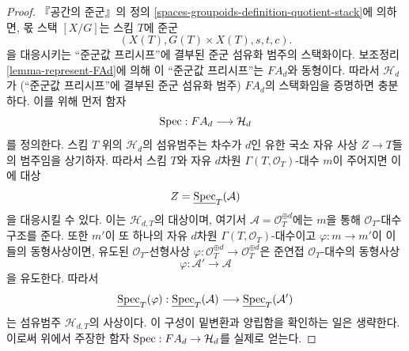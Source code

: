 \begin{proof}
『공간의 준군』의 정의
\ref{spaces-groupoids-definition-quotient-stack}에 의하면,
몫 스택 $[X/G]$는 스킴 $T$에 준군
$$
(X(T), G(T) \times X(T), s, t, c).
$$
을 대응시키는 ``준군값 프리시프''에 결부된 준군 섬유화 범주의
스택화이다. 보조정리 \ref{lemma-represent-FAd}에 의해 이
``준군값 프리시프''는 $FA_d$와 동형이다. 따라서
$\mathcal{H}_d$가 (``준군값 프리시프''에 결부된 준군 섬유화 범주)
$FA_d$의 스택화임을 증명하면 충분하다. 이를 위해 먼저 함자
$$
\mathop{\mathrm{Spec}} : FA_d \longrightarrow \mathcal{H}_d
$$
를 정의한다. 스킴 $T$ 위의 $\mathcal{H}_d$의 섬유범주는
차수가 $d$인 유한 국소 자유 사상 $Z \to T$들의 범주임을 상기하자.
따라서 스킴 $T$와 자유 $d$차원 $\Gamma(T, \mathcal{O}_T)$-대수
$m$이 주어지면 이에 대상
$$
Z = \underline{\mathop{\mathrm{Spec}}}_T(\mathcal{A})
$$
을 대응시킬 수 있다. 이는 $\mathcal{H}_{d, T}$의 대상이며,
여기서 $\mathcal{A} = \mathcal{O}_T^{\oplus d}$에는 $m$을 통해
$\mathcal{O}_T$-대수 구조를 준다. 또한 $m'$이 또 하나의 자유
$d$차원 $\Gamma(T, \mathcal{O}_T)$-대수이고
$\varphi : m \to m'$이 이들의 동형사상이면, 유도된
$\mathcal{O}_T$-선형사상
$\varphi : \mathcal{O}_T^{\oplus d} \to \mathcal{O}_T^{\oplus d}$은
준연접 $\mathcal{O}_T$-대수의 동형사상
$$
\varphi : \mathcal{A}' \longrightarrow \mathcal{A}
$$
을 유도한다. 따라서
$$
\underline{\mathop{\mathrm{Spec}}}_T(\varphi) :
\underline{\mathop{\mathrm{Spec}}}_T(\mathcal{A})
\longrightarrow
\underline{\mathop{\mathrm{Spec}}}_T(\mathcal{A}')
$$
는 섬유범주 $\mathcal{H}_{d, T}$의 사상이다. 이 구성이 밑변환과
양립함을 확인하는 일은 생략한다. 이로써 위에서 주장한 함자
$\mathop{\mathrm{Spec}} : FA_d \to \mathcal{H}_d$를 실제로 얻는다.


\end{proof}
